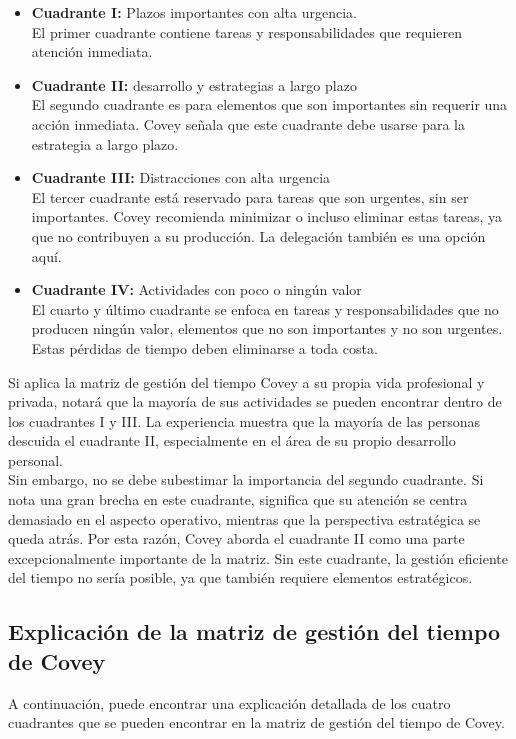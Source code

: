 \documentclass[10pt]{book}
\begin{document}
\begin{itemize}
\item \textbf{Cuadrante I:} Plazos importantes con alta urgencia. \\
 El primer cuadrante contiene tareas y responsabilidades que requieren atención inmediata.
\item \textbf{Cuadrante II:} desarrollo y estrategias a largo plazo\\
El segundo cuadrante es para elementos que son importantes sin requerir una acción inmediata. Covey señala que este cuadrante debe usarse para la estrategia a largo plazo.
\item \textbf{Cuadrante III:} Distracciones con alta urgencia\\
El tercer cuadrante está reservado para tareas que son urgentes, sin ser importantes. Covey recomienda minimizar o incluso eliminar estas tareas, ya que no contribuyen a su producción. La delegación también es una opción aquí.
\item \textbf{Cuadrante IV:} Actividades con poco o ningún valor\\
El cuarto y último cuadrante se enfoca en tareas y responsabilidades que no producen ningún valor, elementos que no son importantes y no son urgentes. Estas pérdidas de tiempo deben eliminarse a toda costa.
\end{itemize}
Si aplica la matriz de gestión del tiempo Covey a su propia vida profesional y privada, notará que la mayoría de sus actividades se pueden encontrar dentro de los cuadrantes I y III. La experiencia muestra que la mayoría de las personas descuida el cuadrante II, especialmente en el área de su propio desarrollo personal.\\
Sin embargo, no se debe subestimar la importancia del segundo cuadrante. Si nota una gran brecha en este cuadrante, significa que su atención se centra demasiado en el aspecto operativo, mientras que la perspectiva estratégica se queda atrás. Por esta razón, Covey aborda el cuadrante II como una parte excepcionalmente importante de la matriz. Sin este cuadrante, la gestión eficiente del tiempo no sería posible, ya que también requiere elementos estratégicos.
\subsection{Explicación de la matriz de gestión del tiempo de Covey}
A continuación, puede encontrar una explicación detallada de los cuatro cuadrantes que se pueden encontrar en la matriz de gestión del tiempo de Covey.
\end{document}
